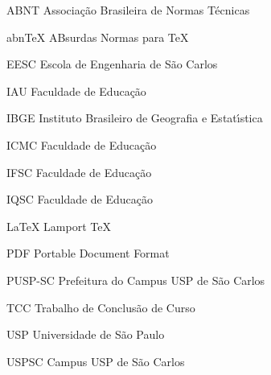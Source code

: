 \begin{siglas}
    \item[ABNT] Associa\c{c}\~ao Brasileira de Normas T\'ecnicas
    \item[abnTeX] ABsurdas Normas para TeX
	\item[EESC] Escola de Engenharia de S\~ao Carlos
	\item[IAU] Faculdade de Educa\c{c}\~ao
	\item[IBGE] Instituto Brasileiro de Geografia e Estat\'{\i}stica
	\item[ICMC] Faculdade de Educa\c{c}\~ao
	\item[IFSC] Faculdade de Educa\c{c}\~ao
	\item[IQSC] Faculdade de Educa\c{c}\~ao
	\item[LaTeX] Lamport TeX
	\item[PDF] Portable Document Format
	\item[PUSP-SC] Prefeitura do Campus USP de S\~ao Carlos
	\item[TCC] Trabalho de Conclus\~ao de Curso
	\item[USP] Universidade de S\~ao Paulo
	\item[USPSC] Campus USP de S\~ao Carlos
\end{siglas}
